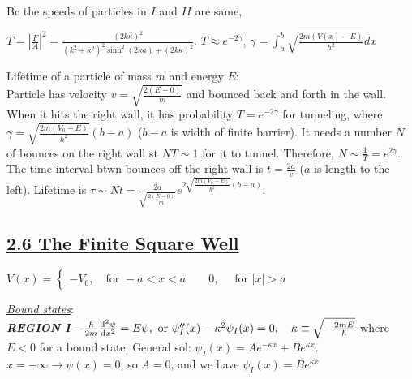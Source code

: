Bc the speeds of particles in $I$ and $II$ are same, 

\tiny
$T = |\frac{F}{A}|^2 = \frac{(2 k \kappa)^2}{(k^2 + \kappa^2)^2 \sinh^2(2\kappa a) + (2 k \kappa)^2}$.
$T \approx e^{-2 \gamma}$, $\gamma = \int_{a}^{b} \sqrt{\frac{2m (V(x) - E)}{\hbar^2}} dx$
\scriptsize

Lifetime of a particle of mass $m$ and energy $E$: \\
Particle has velocity $v = \sqrt{\frac{2(E-0)}{m}}$ and bounced back and forth in the wall. When it hits the right wall, it has probability $T=e^{-2\gamma}$ for tunneling, where $\gamma = \sqrt{\frac{2m(V_0 - E)}{\hbar^2}}(b-a)$ ($b-a$ is width of finite barrier). It needs a number $N$ of bounces on the right wall st $NT \sim 1$ for it to tunnel. Therefore, $N \sim \frac{1}{T} = e^{2\gamma}$. The time interval btwn bounces off the right wall is $t = \frac{2a}{v}$ ($a$ is length to the left). Lifetime is $\tau \sim Nt = \frac{2a}{\sqrt{\frac{2(E-0)}{m}}} e^{2 \sqrt{\frac{2m(V_0 - E)}{\hbar^2}} (b-a)}$.

\subsection{\underline{2.6 The Finite Square Well}}
$V(x) = 
\begin{cases}
    -V_{0}, \quad \textrm{for } -a < x < a \qquad
    0, \quad \textrm{ for } |x| > a &
\end{cases}$



\textit{\underline{Bound states}}: \\

\textbf{\textit{REGION I}}
$-\frac{\hbar}{2m} \dv[2]{\psi}{x} = E \psi, \textrm{ or } \psi''_{I}(x) - \kappa^2 \psi_{I}(x) = 0, \quad \kappa \equiv \sqrt{-\frac{2mE}{\hbar}}$
where $E < 0$ for a bound state. 
General sol: $\psi_{I}(x) = Ae^{-\kappa x} + B e^{\kappa x}$. \\
$x = -\infty \rightarrow \psi(x) = 0$, so $A = 0$, and we have $\psi_{I}(x) = Be^{\kappa x}$

